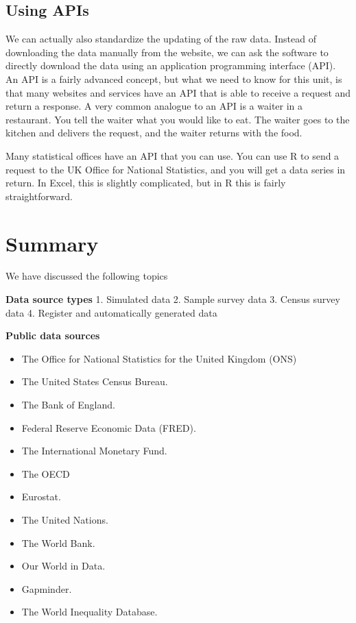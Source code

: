 \documentclass[
]{book}
\providecommand{\tightlist}{%
  \setlength{\itemsep}{0pt}\setlength{\parskip}{0pt}}
\begin{document}
\hypertarget{using-apis}{%
\subsection*{Using APIs}\label{using-apis}}

We can actually also standardize the updating of the raw data. Instead of downloading the data manually from the website, we can ask the software to directly download the data using an application programming interface (API). An API is a fairly advanced concept, but what we need to know for this unit, is that many websites and services have an API that is able to receive a request and return a response. A very common analogue to an API is a waiter in a restaurant. You tell the waiter what you would like to eat. The waiter goes to the kitchen and delivers the request, and the waiter returns with the food.

Many statistical offices have an API that you can use. You can use R to send a request to the UK Office for National Statistics, and you will get a data series in return. In Excel, this is slightly complicated, but in R this is fairly straightforward.

\hypertarget{summary}{%
\section{Summary}\label{summary}}

We have discussed the following topics

\textbf{Data source types}
1. Simulated data
2. Sample survey data
3. Census survey data
4. Register and automatically generated data

\textbf{Public data sources}

\begin{itemize}
\tightlist
\item
  The Office for National Statistics for the United Kingdom (ONS)
\item
  The United States Census Bureau.
\item
  The Bank of England.
\item
  Federal Reserve Economic Data (FRED).
\item
  The International Monetary Fund.
\item
  The OECD
\item
  Eurostat.
\item
  The United Nations.
\item
  The World Bank.
\item
  Our World in Data.
\item
  Gapminder.
\item
  The World Inequality Database.
\end{itemize}
\end{document}
